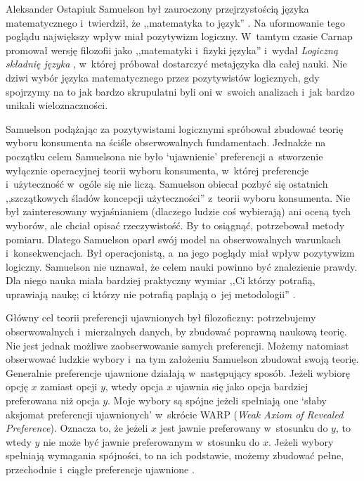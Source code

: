 \begin{artplenv}{Aleksander Ostapiuk}
Samuelson był zauroczony przejrzystością języka matematycznego i~twierdził, że ,,matematyka to język''
\parencite[s.~52]{samuelson_economic_1952}.
Na uformowanie tego poglądu największy wpływ miał pozytywizm
logiczny. W~tamtym czasie Carnap promował wersję filozofii jako ,,matematyki i~fizyki języka''
\parencite[s.~180]{richardson_geometry_2003}
i~wydał \textit{Logiczną składnię języka}
\parencite{carnap_logical_1936},
w~której próbował dostarczyć metajęzyka dla całej nauki. Nie dziwi wybór
języka matematycznego przez pozytywistów logicznych, gdy spojrzymy na to jak bardzo skrupulatni byli oni w~swoich
analizach i~jak bardzo unikali wieloznaczności.

Samuelson
\parencite*{samuelson_note_1938}
podążając za pozytywistami logicznymi spróbował zbudować teorię wyboru
konsumenta na ściśle obserwowalnych fundamentach. Jednakże na początku celem Samuelsona nie było `ujawnienie'
preferencji a~stworzenie wyłącznie operacyjnej teorii wyboru konsumenta, w~której
preferencje i~użyteczność w~ogóle się nie liczą. Samuelson obiecał pozbyć się ostatnich
,,szczątkowych śladów koncepcji użyteczności''
\parencite[s.~61]{samuelson_note_1938}
z~teorii wyboru konsumenta. Nie był zainteresowany wyjaśnianiem
(dlaczego ludzie coś wybierają) ani oceną tych wyborów, ale chciał opisać rzeczywistość. By to osiągnąć, potrzebował
metody pomiaru. Dlatego Samuelson oparł swój model na obserwowalnych warunkach i~konsekwencjach. Był
operacjonistą, a~na jego poglądy miał wpływ pozytywizm logiczny. Samuelson nie uznawał, że celem nauki
powinno być znalezienie prawdy.
Dla niego nauka miała bardziej praktyczny wymiar ,,Ci którzy potrafią, uprawiają naukę;
ci którzy nie potrafią paplają o~jej metodologii''
\parencite[s.~240]{samuelson_my_1992}.

Główny cel teorii preferencji ujawnionych był filozoficzny: potrzebujemy obserwowalnych i~mierzalnych danych, by
zbudować poprawną naukową teorię. Nie jest jednak możliwe zaobserwowanie samych preferencji. Możemy natomiast
obserwować ludzkie wybory i~na tym założeniu Samuelson zbudował swoją teorię. Generalnie preferencje ujawnione działają
w~następujący sposób. Jeżeli wybiorę opcję $x$ zamiast opcji $y$, wtedy opcja $x$ ujawnia się jako
opcja bardziej preferowana niż opcja $y$. Moje wybory są spójne jeżeli spełniają one `słaby aksjomat preferencji
ujawnionych' w~skrócie WARP (\textit{Weak Axiom of Revealed Preference}). Oznacza to, że jeżeli $x$ jest jawnie
preferowany w~stosunku do $y$, to wtedy $y$ nie może być jawnie preferowanym w~stosunku do $x$.
Jeżeli wybory spełniają wymagania spójności, to na ich podstawie, możemy zbudować pełne, przechodnie i~ciągłe
preferencje ujawnione
\parencite{sen_choice_1971,sen_behaviour_1973}.


\end{artplenv}
